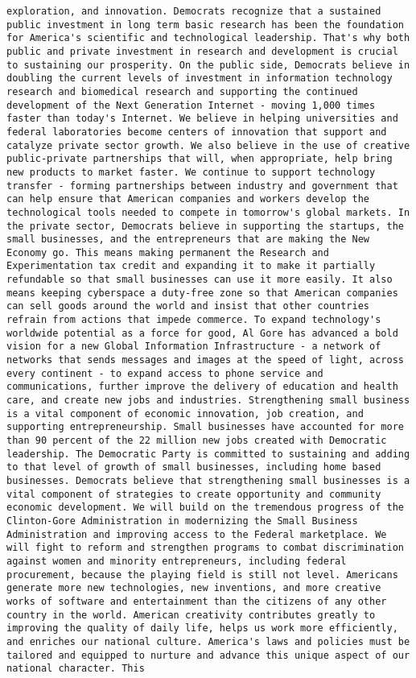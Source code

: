 \documentclass[
]{article}
\begin{document}
\begin{verbatim}
exploration, and innovation. Democrats recognize that a sustained public investment in long term basic research has been the foundation for America's scientific and technological leadership. That's why both public and private investment in research and development is crucial to sustaining our prosperity. On the public side, Democrats believe in doubling the current levels of investment in information technology research and biomedical research and supporting the continued development of the Next Generation Internet - moving 1,000 times faster than today's Internet. We believe in helping universities and federal laboratories become centers of innovation that support and catalyze private sector growth. We also believe in the use of creative public-private partnerships that will, when appropriate, help bring new products to market faster. We continue to support technology transfer - forming partnerships between industry and government that can help ensure that American companies and workers develop the technological tools needed to compete in tomorrow's global markets. In the private sector, Democrats believe in supporting the startups, the small businesses, and the entrepreneurs that are making the New Economy go. This means making permanent the Research and Experimentation tax credit and expanding it to make it partially refundable so that small businesses can use it more easily. It also means keeping cyberspace a duty-free zone so that American companies can sell goods around the world and insist that other countries refrain from actions that impede commerce. To expand technology's worldwide potential as a force for good, Al Gore has advanced a bold vision for a new Global Information Infrastructure - a network of networks that sends messages and images at the speed of light, across every continent - to expand access to phone service and communications, further improve the delivery of education and health care, and create new jobs and industries. Strengthening small business is a vital component of economic innovation, job creation, and supporting entrepreneurship. Small businesses have accounted for more than 90 percent of the 22 million new jobs created with Democratic leadership. The Democratic Party is committed to sustaining and adding to that level of growth of small businesses, including home based businesses. Democrats believe that strengthening small businesses is a vital component of strategies to create opportunity and community economic development. We will build on the tremendous progress of the Clinton-Gore Administration in modernizing the Small Business Administration and improving access to the Federal marketplace. We will fight to reform and strengthen programs to combat discrimination against women and minority entrepreneurs, including federal procurement, because the playing field is still not level. Americans generate more new technologies, new inventions, and more creative works of software and entertainment than the citizens of any other country in the world. American creativity contributes greatly to improving the quality of daily life, helps us work more efficiently, and enriches our national culture. America's laws and policies must be tailored and equipped to nurture and advance this unique aspect of our national character. This 
\end{verbatim}
\end{document}
